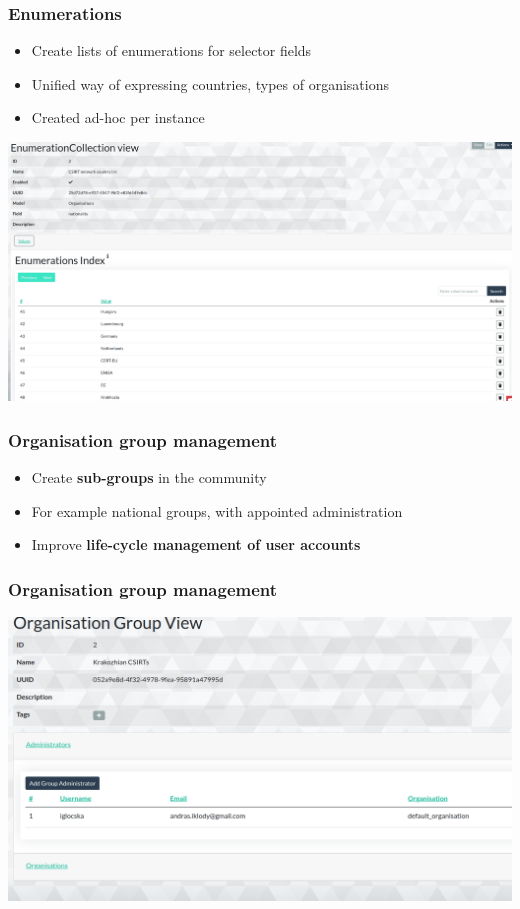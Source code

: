 \begin{frame}
\frametitle{Enumerations}
    \begin{itemize}
        \item Create lists of enumerations for selector fields
        \item Unified way of expressing countries, types of organisations
        \item Created ad-hoc per instance
    \end{itemize}
    \begin{center}
        \includegraphics[width=1.0\linewidth]{pictures/enumeration.png}
    \end{center}
\end{frame}

\begin{frame}
\frametitle{Organisation group management}
    \begin{itemize}
        \item Create {\bf sub-groups} in the community
        \item For example national groups, with appointed administration
        \item Improve {\bf life-cycle management of user accounts}
    \end{itemize}
\end{frame}

\begin{frame}
\frametitle{Organisation group management}
    \begin{center}
        \includegraphics[width=1.0\linewidth]{pictures/OrgGroup.png}
    \end{center}
\end{frame}


